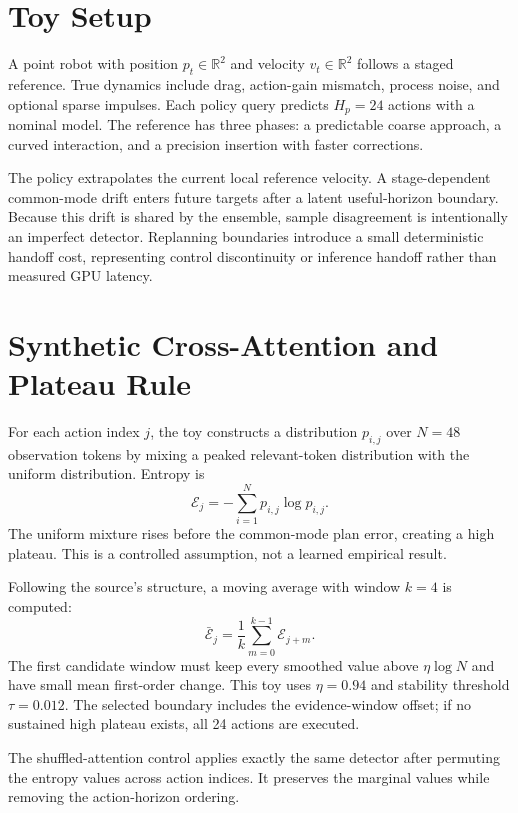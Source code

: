 \documentclass[11pt]{article}
\begin{document}
\section{Toy Setup}
A point robot with position $p_t\in\mathbb{R}^2$ and velocity $v_t\in\mathbb{R}^2$ follows a staged reference. True dynamics include drag, action-gain mismatch, process noise, and optional sparse impulses. Each policy query predicts $H_p=24$ actions with a nominal model. The reference has three phases: a predictable coarse approach, a curved interaction, and a precision insertion with faster corrections.

The policy extrapolates the current local reference velocity. A stage-dependent common-mode drift enters future targets after a latent useful-horizon boundary. Because this drift is shared by the ensemble, sample disagreement is intentionally an imperfect detector. Replanning boundaries introduce a small deterministic handoff cost, representing control discontinuity or inference handoff rather than measured GPU latency.

\section{Synthetic Cross-Attention and Plateau Rule}
For each action index $j$, the toy constructs a distribution $p_{i,j}$ over $N=48$ observation tokens by mixing a peaked relevant-token distribution with the uniform distribution. Entropy is
\begin{equation}
  \mathcal{E}_j=-\sum_{i=1}^{N}p_{i,j}\log p_{i,j}.
\end{equation}
The uniform mixture rises before the common-mode plan error, creating a high plateau. This is a controlled assumption, not a learned empirical result.

Following the source's structure, a moving average with window $k=4$ is computed:
\begin{equation}
 \bar{\mathcal{E}}_j=\frac{1}{k}\sum_{m=0}^{k-1}\mathcal{E}_{j+m}.
\end{equation}
The first candidate window must keep every smoothed value above $\eta\log N$ and have small mean first-order change. This toy uses $\eta=0.94$ and stability threshold $\tau=0.012$. The selected boundary includes the evidence-window offset; if no sustained high plateau exists, all 24 actions are executed.

The shuffled-attention control applies exactly the same detector after permuting the entropy values across action indices. It preserves the marginal values while removing the action-horizon ordering.
\end{document}
